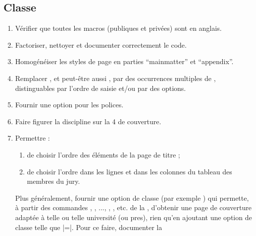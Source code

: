 \subsection{Classe}
\label{sec-classe-ult}

\begin{enumerate}
\item Vérifier que toutes les macros (publiques et privées) sont en anglais.
\item Factoriser, nettoyer et documenter correctement le code.
\item Homogénéiser les styles de page en parties \enquote{mainmatter} et
  \enquote{appendix}.
\item Remplacer , et peut-être aussi , par des
  occurrences multiples de , distinguables par l'ordre de saisie
  et/ou par des  options.
\item Fournir une option pour les polices.
\item Faire figurer la discipline sur la 4\ieme{} de couverture.
\item Permettre :
  \begin{enumerate}
  \item de choisir l'ordre des éléments de la page de titre ;
  \item de choisir l'ordre dans les lignes et dans les colonnes du
    tableau des membres du jury.
  \end{enumerate}
  Plus généralement, fournir une option de classe (par exemple
  ) qui permette, à partir des commandes
  , , ...,
  , , etc. de la \yatcl{},
  d'obtenir une page de couverture adaptée à telle ou telle université (ou
  \gls{pres}), rien qu'en ajoutant une option de classe telle que
  |=|. Pour ce faire, documenter la

\end{enumerate}
